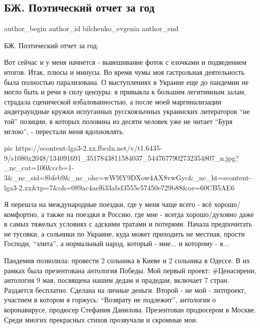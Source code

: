  
 
 
 
 
 
\subsection{БЖ. Поэтический отчет за год}
\label{sec:30_12_2020.fb.bilchenko_evgenia.1.otchet_poezia_god}
\ifcmt
 author_begin
   author_id bilchenko_evgenia
 author_end
\fi

БЖ. Поэтический отчет за год.

Вот сейчас и у меня начнется - вывешивание фоток с елочками и подведением
итогов. Итак, плюсы и минусы. Во время чумы моя гастрольная деятельность была
полностью парализована. О выступлениях в Украине еще до пандемии не могло быть
и речи в силу цензуры: я привыкла к большим легитимным залам, страдала
сценической избалованностью, а после моей маргинализации андеграундные кружки
испуганных русскоязычных украинских литераторов \enquote{не той} позиции, в которых
половина из десяти человек уже не читает \enquote{Буря мглою}, - перестали меня
вдохновлять. 

\ifcmt
  pic https://scontent-lga3-2.xx.fbcdn.net/v/t1.6435-9/s1080x2048/134091691_3517843811584037_5447677902732354807_n.jpg?_nc_cat=100&ccb=1-3&_nc_sid=8bfeb9&_nc_ohc=wW9lY9DXow4AX8vwGyc&_nc_ht=scontent-lga3-2.xx&tp=7&oh=089ac4aef633abd3555c57450e729b88&oe=60CB5AE6
\fi

Я перешла на международные поездки, где у меня чаще всего - всё
хорошо/комфортно, а также на поездки в Россию, где мне - всегда хорошо/духовно
даже в самых тяжелых условиях с адскими тратами и потерями. Начала предпочитать
не тусовки, а сольники по Украине, куда может приходить не местная, прости
Господи, \enquote{элита}, а нормальный народ, который - мне... и которому - я...

Пандемия позволила: провести 2 сольника в Киеве и 2 сольника в Одессе. В их
рамках была презентована антология Победы. Мой первый проект: #Ценасирени,
антология 9 мая, посвящена нашим дедам и прадедам, включает 7 стран. Раздается
бесплатно. Сделана на личные деньги. Второй - не мой - литпроект, участием в
котором я горжусь: \enquote{Возврату не подлежит}, антология о коронавирусе, продюсер
Стефания Данилова. Презентован продюсером в Москве. Среди многих прекрасных
стихов прозвучали и скромные мои.

